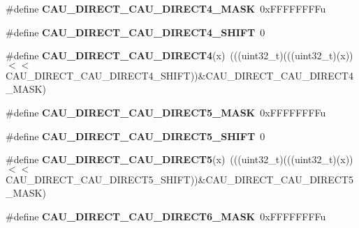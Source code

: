 \begin{DoxyCompactItemize}
\item 
\#define {\bfseries C\+A\+U\+\_\+\+D\+I\+R\+E\+C\+T\+\_\+\+C\+A\+U\+\_\+\+D\+I\+R\+E\+C\+T4\+\_\+\+M\+A\+SK}~0x\+F\+F\+F\+F\+F\+F\+F\+Fu\hypertarget{group__CAU__Register__Masks_gae8d866b4ec3bf7cad4a7983517e615b7}{}\label{group__CAU__Register__Masks_gae8d866b4ec3bf7cad4a7983517e615b7}

\item 
\#define {\bfseries C\+A\+U\+\_\+\+D\+I\+R\+E\+C\+T\+\_\+\+C\+A\+U\+\_\+\+D\+I\+R\+E\+C\+T4\+\_\+\+S\+H\+I\+FT}~0\hypertarget{group__CAU__Register__Masks_ga14860fd31f4e7f9792da121883d992d9}{}\label{group__CAU__Register__Masks_ga14860fd31f4e7f9792da121883d992d9}

\item 
\#define {\bfseries C\+A\+U\+\_\+\+D\+I\+R\+E\+C\+T\+\_\+\+C\+A\+U\+\_\+\+D\+I\+R\+E\+C\+T4}(x)~(((uint32\+\_\+t)(((uint32\+\_\+t)(x))$<$$<$C\+A\+U\+\_\+\+D\+I\+R\+E\+C\+T\+\_\+\+C\+A\+U\+\_\+\+D\+I\+R\+E\+C\+T4\+\_\+\+S\+H\+I\+FT))\&C\+A\+U\+\_\+\+D\+I\+R\+E\+C\+T\+\_\+\+C\+A\+U\+\_\+\+D\+I\+R\+E\+C\+T4\+\_\+\+M\+A\+SK)\hypertarget{group__CAU__Register__Masks_gaf17ec77a232bb8d8322c995e1e4808a8}{}\label{group__CAU__Register__Masks_gaf17ec77a232bb8d8322c995e1e4808a8}

\item 
\#define {\bfseries C\+A\+U\+\_\+\+D\+I\+R\+E\+C\+T\+\_\+\+C\+A\+U\+\_\+\+D\+I\+R\+E\+C\+T5\+\_\+\+M\+A\+SK}~0x\+F\+F\+F\+F\+F\+F\+F\+Fu\hypertarget{group__CAU__Register__Masks_gaa8212c898d5d71af9b7003bcc5c68a58}{}\label{group__CAU__Register__Masks_gaa8212c898d5d71af9b7003bcc5c68a58}

\item 
\#define {\bfseries C\+A\+U\+\_\+\+D\+I\+R\+E\+C\+T\+\_\+\+C\+A\+U\+\_\+\+D\+I\+R\+E\+C\+T5\+\_\+\+S\+H\+I\+FT}~0\hypertarget{group__CAU__Register__Masks_ga7f59928c2b946e1d249aa9b3b3fdd537}{}\label{group__CAU__Register__Masks_ga7f59928c2b946e1d249aa9b3b3fdd537}

\item 
\#define {\bfseries C\+A\+U\+\_\+\+D\+I\+R\+E\+C\+T\+\_\+\+C\+A\+U\+\_\+\+D\+I\+R\+E\+C\+T5}(x)~(((uint32\+\_\+t)(((uint32\+\_\+t)(x))$<$$<$C\+A\+U\+\_\+\+D\+I\+R\+E\+C\+T\+\_\+\+C\+A\+U\+\_\+\+D\+I\+R\+E\+C\+T5\+\_\+\+S\+H\+I\+FT))\&C\+A\+U\+\_\+\+D\+I\+R\+E\+C\+T\+\_\+\+C\+A\+U\+\_\+\+D\+I\+R\+E\+C\+T5\+\_\+\+M\+A\+SK)\hypertarget{group__CAU__Register__Masks_ga1f7ce76ab2e7c9239af0b250337e1055}{}\label{group__CAU__Register__Masks_ga1f7ce76ab2e7c9239af0b250337e1055}

\item 
\#define {\bfseries C\+A\+U\+\_\+\+D\+I\+R\+E\+C\+T\+\_\+\+C\+A\+U\+\_\+\+D\+I\+R\+E\+C\+T6\+\_\+\+M\+A\+SK}~0x\+F\+F\+F\+F\+F\+F\+F\+Fu\hypertarget{group__CAU__Register__Masks_ga971c00d2038809c2c31c18f8942807ec}{}\label{group__CAU__Register__Masks_ga971c00d2038809c2c31c18f8942807ec}


\end{DoxyCompactItemize}
